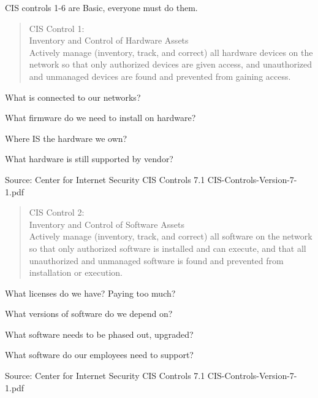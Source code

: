 \documentclass[Screen16to9,17pt]{foils}
\begin{document}

CIS controls 1-6 are Basic, everyone must do them.


\begin{quote}
CIS Control 1:\\
Inventory and Control of Hardware Assets\\
Actively manage (inventory, track, and correct) all hardware devices on the network so that only authorized devices are given access, and unauthorized and unmanaged devices are found and prevented from gaining access.
\end{quote}

\begin{list1}
\item What is connected to our networks?
\item What firmware do we need to install on hardware?
\item Where IS the hardware we own?
\item What hardware is still supported by vendor?
\end{list1}

Source: Center for Internet Security CIS Controls 7.1 CIS-Controls-Version-7-1.pdf



\begin{quote}
CIS Control 2:\\
Inventory and Control of Software Assets\\
Actively manage (inventory, track, and correct) all software on the network so that only authorized software is installed and can execute, and that all unauthorized and unmanaged software is found and prevented from installation or execution.
\end{quote}

\begin{list1}
\item What licenses do we have? Paying too much?
\item What versions of software do we depend on?
\item What software needs to be phased out, upgraded?
\item What software do our employees need to support?
\end{list1}

Source: Center for Internet Security CIS Controls 7.1 CIS-Controls-Version-7-1.pdf


\end{document}
